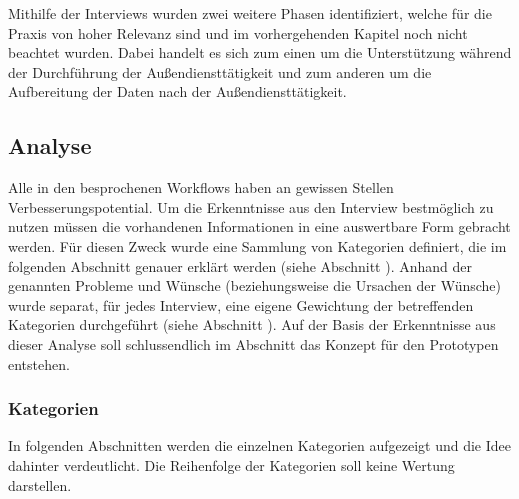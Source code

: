 \documentclass[Bachelorarbeit.tex]{subfiles}
\begin{document}
Mithilfe der Interviews wurden zwei weitere Phasen identifiziert, welche für die Praxis von hoher Relevanz sind und im vorhergehenden Kapitel noch nicht beachtet wurden.
Dabei handelt es sich zum einen um die Unterstützung während der Durchführung der Außendiensttätigkeit und zum anderen um die Aufbereitung der Daten nach der Außendiensttätigkeit.

\subsection{Analyse}
\label{AnalyseInterviews}
Alle in den  besprochenen Workflows haben an gewissen Stellen Verbesserungspotential. 
Um die Erkenntnisse aus den Interview bestmöglich zu nutzen müssen die vorhandenen Informationen in eine auswertbare Form gebracht werden.
Für diesen Zweck wurde eine Sammlung von Kategorien definiert, die im folgenden Abschnitt genauer erklärt werden (siehe Abschnitt ).
Anhand der genannten Probleme und Wünsche (beziehungsweise die Ursachen der Wünsche) wurde separat, für jedes Interview, eine eigene Gewichtung der betreffenden Kategorien durchgeführt (siehe Abschnitt ). 
Auf der Basis der Erkenntnisse aus dieser Analyse soll schlussendlich im Abschnitt  das Konzept für den Prototypen entstehen.


\subsubsection{Kategorien}
\label{analyse:kategorien}
In folgenden Abschnitten werden die einzelnen Kategorien aufgezeigt und die Idee dahinter verdeutlicht.
Die Reihenfolge der Kategorien soll keine Wertung darstellen.
\end{document}

